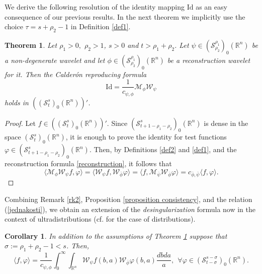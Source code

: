 \documentclass[reqno,12pt]{amsart}
\theoremstyle{plain}
\newtheorem{theorem}{Theorem}
\newtheorem{corollary}{Corollary}
\theoremstyle{definition}
\theoremstyle{remark}
\begin{document}
\par

We derive the following resolution of the identity mapping
$ \mathrm{Id}$ as an easy consequence of our previous results. In the next theorem we implicitly use the choice $\tau=s+\rho_{2}-1$ in Definition \ref{def1}.

\par

\begin{theorem} \label{th-res-identity}
Let  $ \rho_1 > 0,$ $ \rho_2 > 1 $, $s > 0$ and $ t > \rho_1 + \rho_2 $.
Let $\psi \in  (\mathcal{S}^{\rho_1}_{\rho_2})_0 (\mathbb{R}^n) $
be a non-degenerate wavelet and let $ \phi \in  (\mathcal{S}^{\rho_1}_{\rho_2})_0 (\mathbb{R}^n) $
be a reconstruction wavelet for it. Then the Calder\'{o}n reproducing formula
$$
\mathrm{Id} = \frac{1}{c_{\psi,\phi}} \mathcal{M}_{\phi}
\mathcal{W}_{\psi}
$$
holds in $ (({\mathcal S}^ s_{t})_0 (\mathbb{R}^n))' $.
\end{theorem}

\begin{proof}
Let $ f \in (({\mathcal S}^s_{t})_0 (\mathbb{R}^n))'. $
Since $ ({\mathcal S}^s _{t+1 - \rho_1 -\rho_2})_0 (\mathbb{R}^n) $
is dense in the space $ ({\mathcal S}^s_{t})_0 (\mathbb{R}^n) $,
it is enough to prove the identity for test functions
$ \varphi \in ({\mathcal S}^s _{t+1 - \rho_1 -\rho_2})_0 (\mathbb{R}^n).$
Then, by Definitions \ref{def2} and \ref{def1}, and the reconstruction formula \eqref{reconstruction}, it follows that
\begin{equation} \label{jednakosti}
\langle  \mathcal{M}_{\phi} \mathcal{W}_{\psi} f,  \varphi \rangle
=
\langle  \mathcal{W}_{\psi} f, \mathcal{W}_{\bar{\phi}} \varphi
\rangle = \langle f, \mathcal{M}_{\overline{\psi}}
\mathcal{W}_{\overline{\phi}} \varphi \rangle =
c_{\bar{\phi},\bar{\psi}} \langle f, \varphi \rangle.
\end{equation}

\end{proof}

\par

Combining Remark \ref{rk2}, Proposition \ref{proposition consistency}, and the relation (\ref{jednakosti}), we obtain an extension of the {\em desingularization} formula now in the context of ultradistributions (cf. \cite{hol1,vindas-pilipovic-2} for the case of distributions).

\par

\begin{corollary}
\label{desingularization ultra} In addition to the assumptions of Theorem \ref{th-res-identity} suppose that $\sigma:=\rho_{1}+\rho_{2}-1<s$. Then,
$$
\langle f, \varphi \rangle = \frac{1}{c_{\psi,\phi}}
\int_0 ^\infty \int_{\mathbb{R}^n}
\mathcal{W}_\psi f (b,a)
\mathcal{W}_{\overline{\phi}} \varphi (b,a)  \frac{dbda}{a}, \: \: \forall \varphi\in (\mathcal{S}^{s-\sigma}_{t-\sigma})_{0}(\mathbb{R}^{n}).
$$
\end{corollary}
\end{document}
